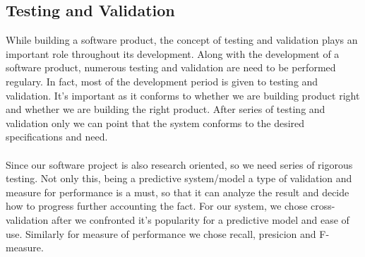 \subsection{Testing and Validation}
While building a software product, the concept of testing and validation plays an important role throughout its development.
Along with the development of a software product, numerous testing and validation are need to be performed regulary.
In fact, most of the development period is given to testing and validation. It's important as it conforms to whether we are building
product right and whether we are building the right product. After series of testing and validation only we can point that the system
conforms to the desired specifications and need.\\
\\
Since our software project is also research oriented, so we need series of rigorous testing. Not only this, being a predictive system/model
a type of validation and measure for performance is a must, so that it can analyze the result and decide how to progress further accounting the fact.
For our system, we chose cross-validation after we confronted it's popularity for a predictive model and ease of use. Similarly for measure of performance we chose recall, presicion 
and F-measure.\\

